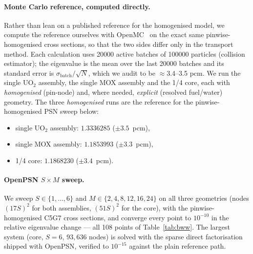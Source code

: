 \documentclass[11pt,a4paper]{article}
\begin{document}
\paragraph{Monte Carlo reference, computed directly.}
Rather than lean on a published reference for the homogenised model, we
compute the reference ourselves with OpenMC~\cite{openmc2015} on the exact
same pinwise-homogenised cross sections, so that the two sides differ only
in the transport method. Each calculation uses 20000 active batches of
100000 particles (collision estimator); the eigenvalue is the
mean over the last 20000 batches and its standard error is
$\sigma_{\mathrm{batch}}/\sqrt{N}$, which we audit to be $\approx$3.4--3.5
pcm. We run the single UO$_2$ assembly, the single MOX assembly and the 1/4
core, each with \emph{homogenised} (pin-node) and, where needed,
\emph{explicit} (resolved fuel/water) geometry. The three
\emph{homogenised} runs are the reference for the pinwise-homogenised PSN
sweep below:
\begin{itemize}
\item single UO$_2$ assembly: $1.3336285$ ($\pm3.5$~pcm),
\item single MOX assembly: $1.1853993$ ($\pm3.3$~pcm),
\item 1/4 core: $1.1868230$ ($\pm3.4$~pcm).
\end{itemize}

\paragraph{OpenPSN $S\times M$ sweep.}
We sweep $S\in\{1,\dots,6\}$ and $M\in\{2,4,8,12,16,24\}$ on all
three geometries (nodes $(17S)^2$ for both assemblies, $(51S)^2$ for the
core), with the pinwise-homogenised C5G7 cross sections, and converge
every point to $10^{-10}$ in the relative eigenvalue change --- all 108
points of
Table~\ref{tab:bww}. The largest system (core, $S{=}6$,
$93{,}636$ nodes) is solved with the sparse direct factorisation
shipped with OpenPSN, verified to $10^{-15}$ against the plain
reference path.
\end{document}
